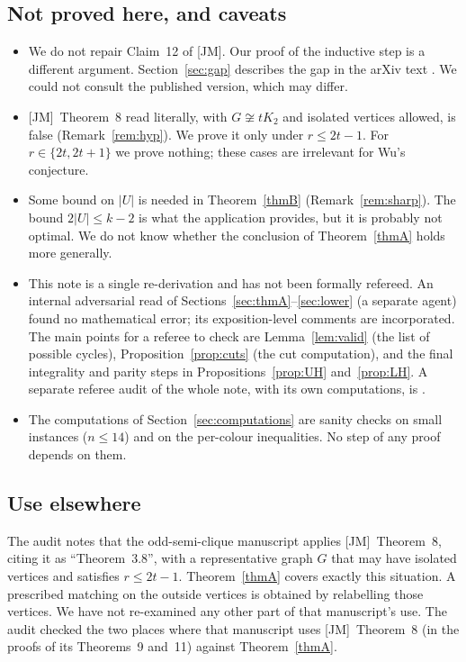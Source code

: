 \documentclass[11pt]{amsart}
\theoremstyle{definition}
\theoremstyle{remark}
\newcommand{\JM}{\textup{[JM]}}
\begin{document}
\subsection*{Not proved here, and caveats}
\begin{itemize}[leftmargin=*]
\item We do not repair Claim~12 of \JM. Our proof of the inductive step is a different
argument. Section~\ref{sec:gap} describes the gap in the arXiv text \cite{JM}. We could not
consult the published version, which may differ.
\item \JM\ Theorem~8 read literally, with $G\not\cong tK_2$ and isolated vertices allowed, is
false (Remark~\ref{rem:hyp}). We prove it only under $r\le 2t-1$. For $r\in\{2t,2t+1\}$ we
prove nothing; these cases are irrelevant for Wu's conjecture.
\item Some bound on $|U|$ is needed in Theorem~\ref{thmB} (Remark~\ref{rem:sharp}). The bound
$2|U|\le k-2$ is what the application provides, but it is probably not optimal. We do not know
whether the conclusion of Theorem~\ref{thmA} holds more generally.
\item This note is a single re-derivation and has not been formally refereed. An internal
adversarial read of Sections~\ref{sec:thmA}--\ref{sec:lower} (a separate agent) found no
mathematical error; its exposition-level comments are incorporated. The main points for a
referee to check are Lemma~\ref{lem:valid} (the list of possible cycles),
Proposition~\ref{prop:cuts} (the cut computation), and the final integrality and parity steps in
Propositions~\ref{prop:UH} and~\ref{prop:LH}. A separate referee audit of the whole note,
with its own computations, is \cite{A10}.
\item The computations of Section~\ref{sec:computations} are sanity checks on small instances
($n\le14$) and on the per-colour inequalities. No step of any proof depends on them.
\end{itemize}

\subsection*{Use elsewhere}
The audit \cite[\S2.2]{A4} notes that the odd-semi-clique manuscript applies \JM\ Theorem~8,
citing it as ``Theorem~3.8'', with a representative graph $G$ that may have isolated vertices
and satisfies $r\le 2t-1$. Theorem~\ref{thmA} covers exactly this situation. A prescribed
matching on the outside vertices is obtained by relabelling those vertices. We have not
re-examined any other part of that manuscript's use. The audit \cite{A10} checked the two places
where that manuscript uses \JM\ Theorem~8 (in the proofs of its Theorems~9 and~11) against
Theorem~\ref{thmA}.
\end{document}
